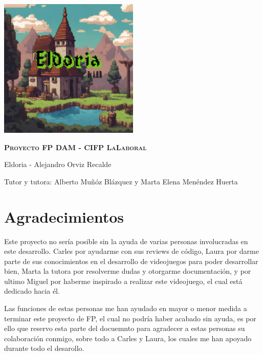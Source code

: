 \documentclass[a4paper]{article}
\begin{document}
\begin{titlepage}
    \centering %
    \includegraphics[width=0.5\textwidth]{Images/Eldoria.png}\par
    \vspace{0.4cm}
    {\scshape\LARGE\textbf{Proyecto FP DAM - CIFP LaLaboral}\par} %
    \vspace{0.4cm}
    {\LARGE\textcolor{bluePortada}{Eldoria - Alejandro Orviz Recalde}\par}
    \vspace{0.2cm}
    {\Large Tutor y tutora: Alberto Muñóz Blázquez y Marta Elena Menéndez Huerta\par}
\end{titlepage}
\clearpage

\tableofcontents
\clearpage

\listoffigures
\clearpage

\listoftables
\clearpage
\section{Agradecimientos}
Este proyecto no sería posible sin la ayuda de varias personas involucradas en este desarrollo. Carles por ayudarme con sus reviews de código,
Laura por darme parte de sus conocimientos en el desarrollo de videojuegos para poder desarrollar bien, Marta la tutora por resolverme dudas y otorgarme
documentación, y por ultimo Miguel por haberme inspirado a realizar este videojuego, el cual está dedicado hacia él.

Las funciones de estas personas me han ayudado en mayor o menor medida a terminar este proyecto de FP, el cual no podría haber acabado sin ayuda, es por ello que reservo
esta parte del docuemnto para agradecer a estas personas su colaboración conmigo, sobre todo a Carles y Laura, los cuales me han apoyado durante todo el desarollo.
\end{document}
